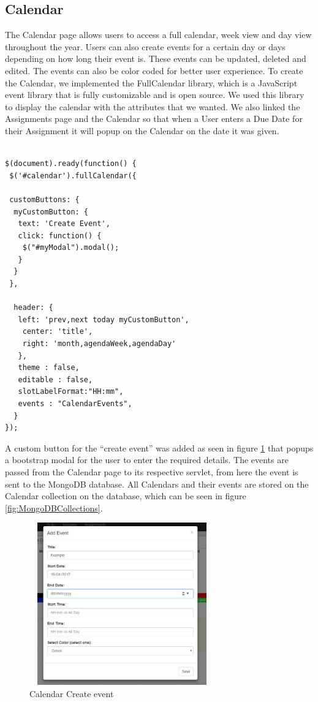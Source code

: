 \subsection{Calendar}
The Calendar page allows users to access a full calendar, week view and day view throughout the year. Users can also create events for a certain day or days depending on how long their event is. These events can be updated, deleted and edited. The events can also be color coded for better user experience. To create the Calendar, we implemented the FullCalendar library, which is a JavaScript event library that is fully customizable and is open source\cite{Calendar}. We used this library to display the calendar with the attributes that we wanted. We also linked the Assignments page and the Calendar so that when a User enters a Due Date for their Assignment it will popup on the Calendar on the date it was given.
\begin{verbatim}

$(document).ready(function() {
 $('#calendar').fullCalendar({

 customButtons: {
  myCustomButton: {
   text: 'Create Event',
   click: function() {
    $("#myModal").modal();
   }
  }
 },

  header: {
   left: 'prev,next today myCustomButton',
    center: 'title',
    right: 'month,agendaWeek,agendaDay'
   },
   theme : false,
   editable : false,
   slotLabelFormat:"HH:mm",
   events : "CalendarEvents",
  }
});
\end{verbatim}
A custom button for the “create event” was added as seen in figure \ref{fig:create} that popups a bootstrap modal for the user to enter the required details. The events are passed from the Calendar page to its respective servlet, from here the event is sent to the MongoDB database. All Calendars and their events are stored on the Calendar collection on the database, which can be seen in figure \ref{fig:MongoDBCollections}. 
\begin{figure}[h]
\centering
\includegraphics[width=8cm, height=7cm]{img/CalendarCreate}
\caption{Calendar Create event}
\label{fig:create}
\end{figure}
